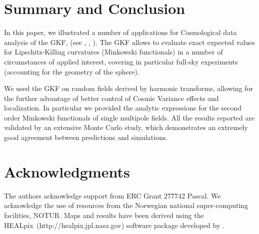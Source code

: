 \documentclass[aps,prd,showpacs,superscriptaddress,groupedaddress]{revtex4-1}  %
\newcommand{\healpix}{HEALpix~}
\begin{document}
\section{Summary and Conclusion}

In this paper, we illustrated a number of applications for
Cosmological data analysis of the GKF, (see \cite
{TaylorAdler2003, Taylor2006, TaylorAdler2009},
\cite{adlerstflour}, \cite{RFG}). The GKF allows to evaluate exact
expected values for Lipschitz-Killing curvatures (Minkowski
functionals) in a number of circumstances of applied interest,
covering in particular full-sky experiments (accounting for the
geometry of the sphere).

We used the GKF on random fields derived
by harmonic transforms, allowing for the further advantage
of better control of Cosmic Variance effects and localization.  In
particular we provided the analytic expressions for the second order Minkowski
functionals of single multipole fields.  All
the results reported are validated by an extensive Monte Carlo study,
which demonstrates an extremely good agreement between predictions and
simulations.



\section{Acknowledgments}
The authors acknowledge support from ERC Grant 277742 Pascal.
We acknowledge the use of resources from the
Norwegian national super-computing facilities, NOTUR. Maps and results
have been derived using the \healpix (http://healpix.jpl.nasa.gov)
software package developed by \cite{healpix}.



%
\end{document}
